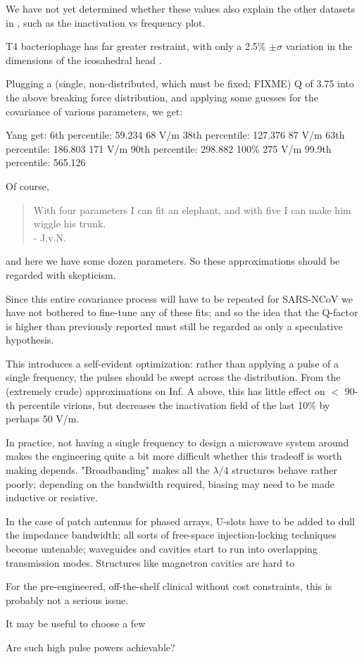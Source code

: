 \documentclass[paper.tex]{subfiles}
\begin{document}
We have not yet determined whether these values also explain the other datasets in \cite{Efficient2015}, such as the inactivation vs frequency plot.


T4 bacteriophage has far greater restraint, with only a 2.5\% $\pm \sigma$ variation in the dimensions of the icosahedral head \cite{Head1988}.\footnotemark



Plugging a (single, non-distributed, which must be fixed; FIXME) Q of 3.75 into the above breaking force distribution, and applying some guesses for the covariance of various parameters, we get:

								Yang get:
6th percentile: 59.234       68 V/m
38th percentile: 127.376		87 V/m
63th percentile: 186.803		171 V/m
90th percentile: 298.882     100\% 275 V/m
99.9th percentile: 565.126 

Of course, 
\begin{quote}
	With four parameters I can fit an elephant, and with five I can make him wiggle his trunk. \\- J.v.N.
\end{quote}

and here we have some dozen parameters. So these approximations should be regarded with skepticism.

Since this entire covariance process will have to be repeated for SARS-NCoV \footnotemark we have not bothered to fine-tune any of these fits; and so the idea that the Q-factor is higher than previously reported must still be regarded as only a speculative hypothesis.


This introduces a self-evident optimization: rather than applying a pulse of a single frequency, the pulses should be swept across the distribution. From the (extremely crude) approximations on Inf. A above, this has little effect on $<$ 90-th percentile virions, but decreases the inactivation field of the last 10\% by perhaps 50 V/m.

In practice, not having a single frequency to design a microwave system around makes the engineering quite a bit more difficult whether this tradeoff is worth making depends. "Broadbanding" makes all the $\lambda / 4$ structures behave rather poorly; depending on the bandwidth required, biasing may need to be made inductive or resistive.

In the case of patch antennas for phased arrays, U-slots have to be added to dull the impedance bandwidth; all sorts of free-space injection-locking techniques become untenable; waveguides and cavities start to run into overlapping transmission modes. Structures like magnetron cavities are hard to 

For the pre-engineered, off-the-shelf clinical without cost constraints, this is probably not a serious issue.

It may be useful to choose a few 

Are such high pulse powers achievable? 




	
\end{document}
